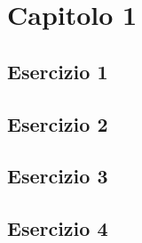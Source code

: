 \section{\textbf{Capitolo 1}}
\subsection{Esercizio 1}

\newpage
\subsection{Esercizio 2}

\newpage
\subsection{Esercizio 3}

\newpage
\subsection{Esercizio 4}

\newpage